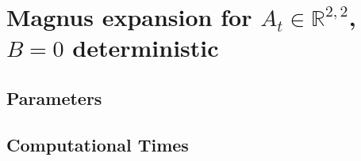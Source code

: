 \section{Magnus expansion for $A_t\in \mathbb{R}^{2,2}$, $B=0$ deterministic}
	
\subsection{Parameters}
	
\subsection{Computational Times}
	
